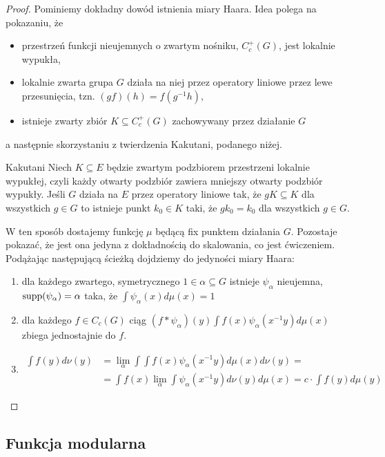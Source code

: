 \begin{proof}
  Pominiemy dokładny dowód istnienia miary Haara. Idea polega na pokazaniu, że 
  \begin{itemize}
    \item przestrzeń funkcji nieujemnych o zwartym nośniku, $C_c^+(G)$, jest lokalnie wypukła,
    \item lokalnie zwarta grupa $G$ działa na niej przez operatory liniowe przez lewe przesunięcia, tzn. $(gf)(h)=f(g^{-1}h)$,
    \item istnieje zwarty zbiór $K\subseteq C_c^+(G)$ zachowywany przez działanie $G$
  \end{itemize}
  
  a następnie skorzystaniu z twierdzenia Kakutani, podanego niżej.

  \begin{theorem}{Kakutani}{}
    Niech $K\subseteq E$ będzie zwartym podzbiorem przestrzeni lokalnie wypukłej, czyli każdy otwarty podzbiór zawiera mniejszy otwarty podzbiór wypukły. Jeśli $G$ działa na $E$ przez operatory liniowe tak, że $gK\subseteq K$ dla wszystkich $g\in G$ to istnieje punkt $k_0\in K$ taki, że $gk_0=k_0$ dla wszystkich $g\in G$.
  \end{theorem}

  W ten sposób dostajemy funkcję $\mu$ będącą fix punktem działania $G$. Pozostaje pokazać, że jest ona jedyna z dokładnością do skalowania, co jest ćwiczeniem. Podążając następującą ścieżką dojdziemy do jedyności miary Haara:
  \begin{enumerate}
    \item dla każdego zwartego, symetrycznego $1\in \alpha\subseteq G$ istnieje $\psi_\alpha$ nieujemna, $\operatorname{supp}(\psi_\alpha)=\alpha$ taka, że $\int\psi_\alpha(x)d\mu(x)=1$
    \item dla każdego $f\in C_c(G)$ ciąg $(f\ast\psi_\alpha)(y)\int f(x)\psi_\alpha(x^{-1}y)d\mu(x)$ zbiega jednostajnie do $f$.
    \item \begin{align*}
        \int f(y)d\nu(y)&=\lim_\alpha\int\int f(x)\psi_\alpha(x^{-1}y)d\mu(x)d\nu(y)=\\ 
                        &=\int f(x)\lim_\alpha\int\psi_\alpha(x^{-1}y)d\nu(y)d\mu(x)=c\cdot \int f(y)d\mu(y)
      \end{align*}
  \end{enumerate}
\end{proof}

\subsection{Funkcja modularna}

